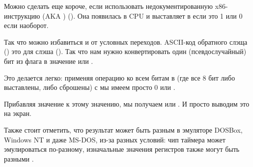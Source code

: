 Можно сделать еще короче, если использовать недокументированную x86-инструкцию  (\ac{AKA} ) ().
Она появилась в \ac{CPU} и выставляет  в 
 если  это 1 или 0 если наоборот.



Так что можно избавиться и от условных переходов.
\ac{ASCII}-код обратного слэща (\q{\textbackslash{}}) 
это  \AndENRU {} для слэша (\q{/}).
%
Так что нам нужно конвертировать один (псевдослучайный) бит из флага  в значение  или .

%
Это делается легко: применяя операцию  ко всем битам в  (где все 8 бит либо выставлены, либо сброшены) с  мы имеем просто 0 или .

%
Прибавляя значение  к этому значению, мы получаем  или .
И просто выводим это на экран.

\subsectionold{\Conclusion{}}

Также стоит отметить, что результат может быть разным в эмуляторе DOSBox, \gls{Windows NT} и даже MS-DOS, 
из-за разных условий:
чип таймера может эмулироваться по-разному, изначальные значения регистров также могут быть разными
.
